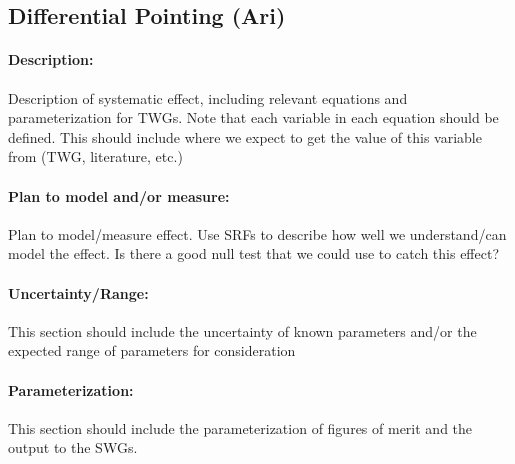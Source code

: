 \subsection{Differential Pointing (Ari)}

\paragraph{Description:}
Description of systematic effect, including relevant equations and
parameterization for TWGs. Note that each variable in each equation should be
defined. This should include where we expect to get the value of this variable
from (TWG, literature, etc.)

\paragraph{Plan to model and/or measure:}
Plan to model/measure effect. Use SRFs to describe how well we understand/can model the effect. Is there a good null test that we could use to catch this effect?

\paragraph{Uncertainty/Range:}
This section should include the uncertainty of
known parameters and/or the expected range of parameters for consideration

\paragraph{Parameterization:}
This section should include the parameterization of figures of
merit and the output to the SWGs.

